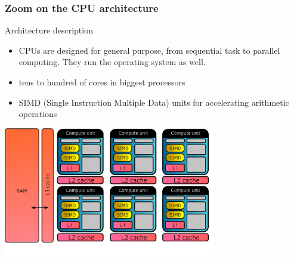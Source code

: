 \documentclass[aspectratio=169]{beamer}
\begin{document}
\begin{frame}
    \frametitle{Zoom on the CPU architecture}
    Architecture description

    \begin{itemize}
        \item CPUs are designed for general purpose, from sequential task to parallel computing. They run the operating system as well.
        \item tens to hundred of cores in biggest processors
        \item SIMD (Single Instruction Multiple Data) units for accelerating arithmetic operations
    \end{itemize}
    
    \begin{center}
        \includegraphics[width=0.7\textwidth]{../../images/cpu_architecture.png}
    \end{center}
    
\end{frame}


\end{document}
